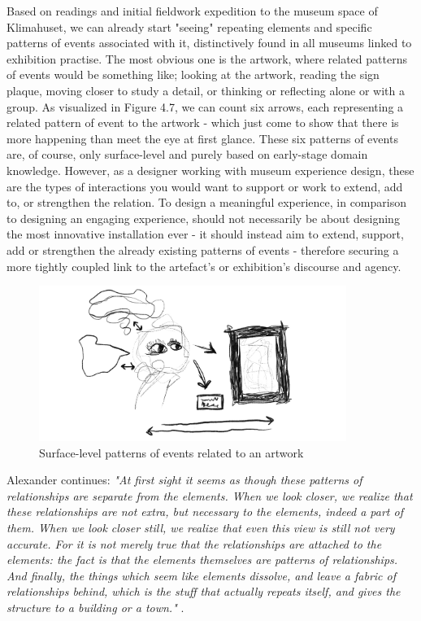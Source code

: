 Based on readings and initial fieldwork expedition to the museum space of Klimahuset, we can already start "seeing" repeating elements and specific patterns of events associated with it, distinctively found in all museums linked to exhibition practise. The most obvious one is the artwork, where related patterns of events would be something like; looking at the artwork, reading the sign plaque, moving closer to study a detail, or thinking or reflecting alone or with a group. As visualized in Figure 4.7, we can count six arrows, each representing a related pattern of event to the artwork - which just come to show that there is more happening than meet the eye at first glance. These six patterns of events are, of course, only surface-level and purely based on early-stage domain knowledge. However, as a designer working with museum experience design, these are the types of interactions you would want to support or work to extend, add to, or strengthen the relation. To design a meaningful experience, in comparison to designing an engaging experience, should not necessarily be about designing the most innovative installation ever - it should instead aim to extend, support, add or strengthen the already existing patterns of events - therefore securing a more tightly coupled link to the artefact's or exhibition's discourse and agency.

\begin{figure}[H]
\centering 
\includegraphics[width=10cm]{pictures/Theory/artwork_pattern.jpeg}
\caption{Surface-level patterns of events related to an artwork}
\end{figure}

Alexander continues: \emph{"At first sight it seems as though these patterns of relationships are separate from the elements. When we look closer, we realize that these relationships are not extra, but necessary to the elements, indeed a part of them. When we look closer still, we realize that even this view is still not very accurate. For it is not merely true that the relationships are attached to the elements: the fact is that the elements themselves are patterns of relationships. And finally, the things which seem like elements dissolve, and leave a fabric of relationships behind, which is the stuff that actually repeats itself, and gives the structure to a building or a town."} \autocite[p. 85-89]{Alexander_book}.

